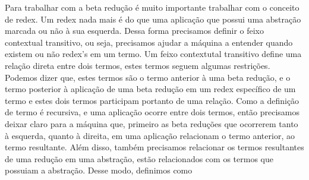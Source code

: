 Para trabalhar com a beta redução é muito importante trabalhar com o conceito de redex. Um redex nada mais é do que uma aplicação
que possui uma abstração marcada ou não à sua esquerda. Dessa forma precisamos definir o feixo contextual transitivo, ou seja, precisamos ajudar
a máquina a entender quando existem ou não redex's em um termo. Um feixo contextutal transitivo define uma relação direta entre dois termos,
estes termos seguem algumas restrições. Podemos dizer que, estes termos são o termo anterior à uma beta redução, e o termo posterior à aplicação
de uma beta redução em um redex específico de um termo e estes dois termos participam portanto de uma relação. Como a definição de termo 
é recursiva, e uma aplicação ocorre entre dois termos, então precisamos deixar claro para a máquina que, primeiro as beta reduções que ocorrerem
tanto à esquerda, quanto à direita, em uma aplicação relacionam o termo anterior, ao termo resultante. Além disso, também precisamos relacionar
os termos resultantes de uma redução em uma abstração, estão relacionados com os termos que possuiam a abstração. Desse modo, definimos como
